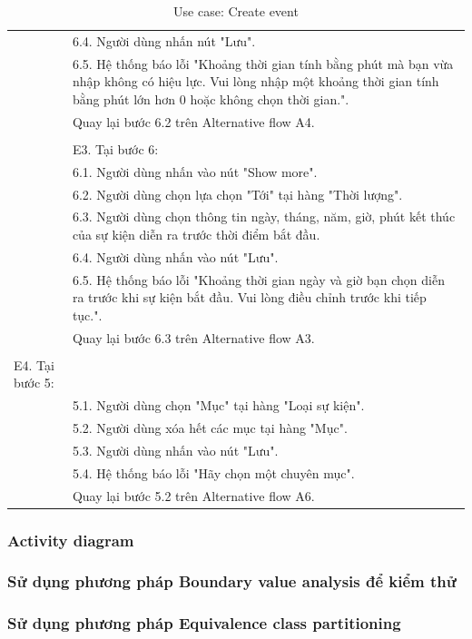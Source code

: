 \documentclass[a4paper, 12pt]{article}
\begin{document}
\begin{table}[H]
\begin{tabular}{|l|p{11cm}|}
        & 6.4. Người dùng nhấn nút "Lưu". \\
        & 6.5. Hệ thống báo lỗi "Khoảng thời gian tính bằng phút mà bạn vừa nhập không có hiệu lực. Vui lòng nhập một khoảng thời gian tính bằng phút lớn hơn 0 hoặc không chọn thời gian.". \\
        & Quay lại bước 6.2 trên Alternative flow A4. \\
        & \\
        & E3. Tại bước 6: \\
        & 6.1. Người dùng nhấn vào nút "Show more". \\
        & 6.2. Người dùng chọn lựa chọn "Tới" tại hàng "Thời lượng". \\
        & 6.3. Người dùng chọn thông tin ngày, tháng, năm, giờ, phút kết thúc của sự kiện diễn ra trước thời điểm bắt đầu. \\
        & 6.4. Người dùng nhấn vào nút "Lưu". \\
        & 6.5. Hệ thống báo lỗi "Khoảng thời gian ngày và giờ bạn chọn diễn ra trước khi sự kiện bắt đầu. Vui lòng điều chỉnh trước khi tiếp tục.". \\
        & Quay lại bước 6.3 trên Alternative flow A3. \\
        & \\
        E4. Tại bước 5: \\
        & 5.1. Người dùng chọn "Mục" tại hàng "Loại sự kiện". \\
        & 5.2. Người dùng xóa hết các mục tại hàng "Mục". \\
        & 5.3. Người dùng nhấn vào nút "Lưu". \\
        & 5.4. Hệ thống báo lỗi "Hãy chọn một chuyên mục". \\
        & Quay lại bước 5.2 trên Alternative flow A6. \\
        \hline
    \end{tabular}
    \caption{Use case: Create event}
    \label{Use case: Create event}
\end{table}
\subsubsection{Activity diagram}
\subsubsection{Sử dụng phương pháp Boundary value analysis để kiểm thử}
\subsubsection{Sử dụng phương pháp Equivalence class partitioning}
\end{document}
